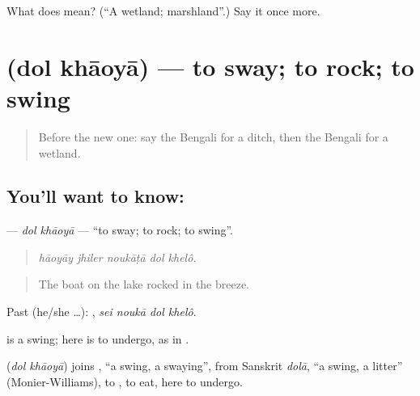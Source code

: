 \begin{tcolorbox}[breakable,colback=teal!4,colframe=teal!35!black,title={Before you move on}]
What does  mean? (\textquotedblleft{}A wetland; marshland\textquotedblright{}.) Say it once more.
\end{tcolorbox}
\section[\texorpdfstring{\bn{দোল} \bn{খাওয়া} (dol khāoyā)}{দোল খাওয়া (dol khāoyā)}]{  (dol khāoyā) — to sway; to rock; to swing}

\label{lesson:BN-C433-dol-khaoya}



\begin{quote}
Before the new one: say the Bengali for a ditch, then the Bengali for a wetland.
\end{quote}

\subsection*{You'll want to know:  }
\textbf{ } — \emph{dol khāoyā} — \textquotedblleft{}to sway; to rock; to swing\textquotedblright{}.

\begin{quote}
    
\end{quote}

\begin{quote}
\emph{hāoyāy jhiler noukāṭā dol khelô.}
\end{quote}

\begin{quote}
The boat on the lake rocked in the breeze.
\end{quote}

Past (he/she …):    , \emph{sei noukā dol khelô}.

 is a swing;  here is to undergo, as in  .

\begin{cousinweb}
\textbf{ } (\emph{dol khāoyā}) joins , \textquotedblleft{}a swing, a swaying\textquotedblright{}, from Sanskrit \emph{dolā}, \textquotedblleft{}a swing, a litter\textquotedblright{} (Monier-Williams), to , to eat, here to undergo.
\end{cousinweb}


